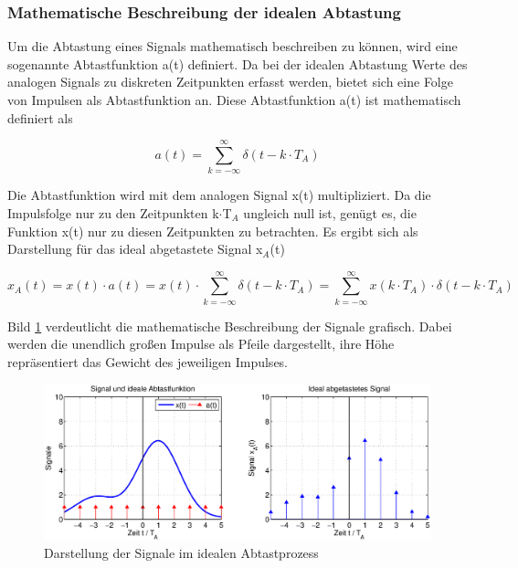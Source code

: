 \subsubsection{Mathematische Beschreibung der idealen Abtastung}

\noindent Um die Abtastung eines Signals mathematisch beschreiben zu können, wird eine sogenannte Abtastfunktion a(t) definiert. Da bei der idealen Abtastung Werte des analogen Signals zu diskreten Zeitpunkten erfasst werden, bietet sich eine Folge von Impulsen als Abtastfunktion an. Diese Abtastfunktion a(t) ist mathematisch definiert als 

\begin{equation}\label{eq:twosix}
a\left(t\right)=\sum _{k=-\infty }^{\infty }\delta \left(t-k\cdot T_{A} \right) 
\end{equation}

\noindent Die Abtastfunktion wird mit dem analogen Signal x(t) multipliziert. Da die Impulsfolge nur zu den Zeitpunkten k$\cdot$T$_{A}$ ungleich null ist, genügt es, die Funktion x(t) nur zu diesen Zeitpunkten zu betrachten. Es ergibt sich als Darstellung für das ideal abgetastete Signal x$_{A}$(t)

\begin{equation}\label{eq:twoseven}
x_{A} \left(t\right)=x\left(t\right)\cdot a\left(t\right)=x\left(t\right)\cdot \sum _{k=-\infty }^{\infty }\delta \left(t-k\cdot T_{A} \right) =\sum _{k=-\infty }^{\infty }x\left(k\cdot T_{A} \right)\cdot \delta \left(t-k\cdot T_{A} \right)
\end{equation}

\noindent Bild \ref{fig:AbtastprozessIdealSignal} verdeutlicht die mathematische Beschreibung der Signale grafisch. Dabei werden die unendlich gro{\ss}en Impulse als Pfeile dargestellt, ihre Höhe repräsentiert das Gewicht des jeweiligen Impulses.

\begin{figure}[H]
  \centerline{\includegraphics[width=1\textwidth]{Kapitel1/Bilder/image5}}
  \caption{Darstellung der Signale im idealen Abtastprozess
}
  \label{fig:AbtastprozessIdealSignal}
\end{figure}


